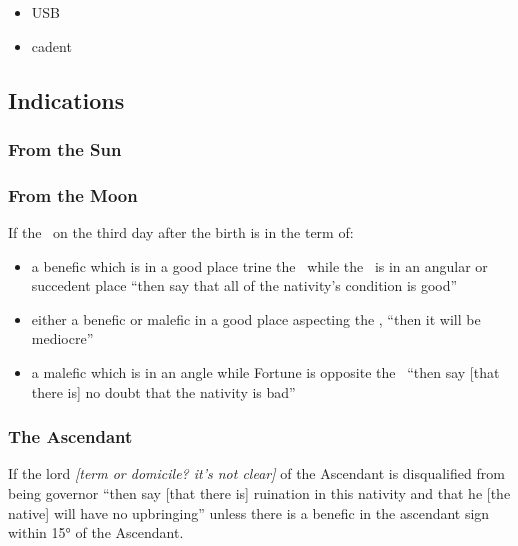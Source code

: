 \begin{itemize}[topsep=0em, itemsep=0em]
\item {} USB
\item {} cadent
\end{itemize}

\subsection{Indications}
\subsubsection{From the Sun}



\subsubsection{From the Moon}
If  the \Moon\, on the third day after the birth is in the term of:

\begin{itemize}[topsep=0em,itemsep=0em]
\item a benefic which is in a good place trine the \Moon\, while the \Moon\, is in an angular or succedent place ``then say that all of the nativity's condition is good''

\item either  a benefic or malefic in a good place aspecting the \Moon, ``then it will be mediocre''

\item a  malefic which is in an angle while Fortune is opposite the \Moon\, ``then say [that there is] no doubt that the nativity is bad''
\end{itemize}

\subsubsection{The Ascendant}
If  the lord \textsl{[term or domicile? it's not clear]} of the Ascendant is disqualified from being governor ``then say [that there is] ruination in this nativity and that he [the native] will have no upbringing'' unless there is a benefic in the ascendant sign within 15° of the Ascendant.

